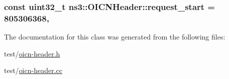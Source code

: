 \hypertarget{classns3_1_1OICNHeader_aeed02f735f48273c72dc5947f2707d62}{
\subsubsection[{request\-\_\-start}]{\setlength{\rightskip}{0pt plus 5cm}const uint32\-\_\-t ns3\-::\-O\-I\-C\-N\-Header\-::request\-\_\-start = 805306368\hspace{0.3cm}{\ttfamily [static]}, {\ttfamily [private]}}}\label{classns3_1_1OICNHeader_aeed02f735f48273c72dc5947f2707d62}


The documentation for this class was generated from the following files\-:\begin{DoxyCompactItemize}
\item 
test/\hyperlink{test_2oicn-header_8h}{oicn-\/header.\-h}\item 
test/\hyperlink{test_2oicn-header_8cc}{oicn-\/header.\-cc}\end{DoxyCompactItemize}
